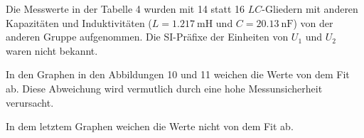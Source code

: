 Die Messwerte in der Tabelle 4 wurden mit 14 statt 16 $LC$-Gliedern mit anderen Kapazitäten und Induktivitäten ($L = \SI{1.217}{\milli\henry}$ und $C = \SI{20.13}{\nano\farad}$) von der anderen Gruppe aufgenommen.
Die SI-Präfixe der Einheiten von $U_1$ und $U_2$ waren nicht bekannt.

In den Graphen in den Abbildungen 10 und 11 weichen die Werte von dem Fit ab. Diese Abweichung wird vermutlich durch eine hohe Messunsicherheit verursacht.

In dem letztem Graphen weichen die Werte nicht von dem Fit ab.







	

